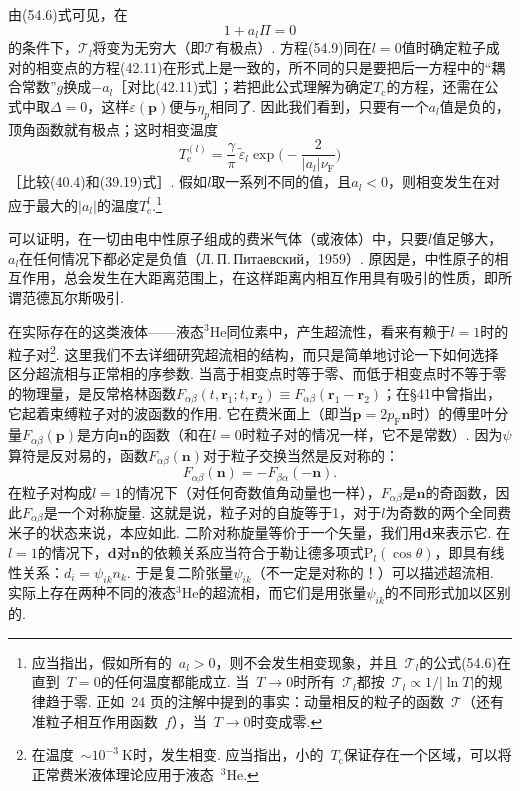 由(54.6)式可见，在
\begin{equation}
1+a_l\Pi=0
\end{equation}
的条件下，$\mathcal{T}_l$将变为无穷大（即$\mathcal{T}$有极点）. 方程(54.9)同在$l=0$值时确定粒子成对的相变点的方程(42.11)在形式上是一致的，所不同的只是要把后一方程中的“耦合常数”$g$换成$-a_l$［对比(42.11)式］；若把此公式理解为确定$T_{\mathrm{c}}$的方程，还需在公式中取$\Delta=0$，这样$\varepsilon(\bm{p})$便与$\eta_p$相同了. 因此我们看到，只要有一个$a_l$值是负的，顶角函数就有极点；这时相变温度
\begin{equation}
T_{\mathrm{c}}^{(l)}=\frac{\gamma}{\pi}\,\tilde{\varepsilon}_l
\exp\biggl(-\frac{2}{|a_l|\nu_{\mathrm{F}}}\biggr)
\end{equation}
［比较(40.4)和(39.19)式］. 假如$l$取一系列不同的值，且$a_l<0$，则相变发生在对应于最大的$|a_l|$的温度$T_{\mathrm{c}}^l$.\footnote{应当指出，假如所有的~$a_l>0$，则不会发生相变现象，并且~$\mathcal{T}_l$的公式(54.6)在直到~$T=0$的任何温度都能成立. 当~$T\to0$时所有~$\mathcal{T}_l$都按~$\mathcal{T}_l\propto1/|\ln T|$的规律趋于零. 正如~24 页的注解中提到的事实：动量相反的粒子的函数~$\mathcal{T}$（还有准粒子相互作用函数~$f$），当~$T\to0$时变成零.}

可以证明，在一切由电中性原子组成的费米气体（或液体）中，只要$l$值足够大，$a_l$在任何情况下都必定是负值（Л.\,П.\,Питаевский，1959）. 原因是，中性原子的相互作用，总会发生在大距离范围上，在这样距离内相互作用具有吸引的性质，即所谓范德瓦尔斯吸引.

在实际存在的这类液体——液态$^3\mathrm{He}$同位素中，产生超流性，看来有赖于$l=1$时的粒子对\footnote{在温度~$\sim10^{-3}\ \mathrm K$时，发生相变. 应当指出，小的~$T_{\mathrm c}$保证存在一个区域，可以将正常费米液体理论应用于液态~$^3$He.}. 这里我们不去详细研究超流相的结构，而只是简单地讨论一下如何选择区分超流相与正常相的序参数. 当高于相变点时等于零、而低于相变点时不等于零的物理量，是反常格林函数$F_{\alpha\beta}(t,\bm{r}_1;t,\bm{r}_2)\equiv F_{\alpha\beta}(\bm{r}_1-\bm{r}_2)$；在§41中曾指出，它起着束缚粒子对的波函数的作用. 它在费米面上（即当$\bm{p}=2p_{\mathrm{F}}\bm{n}$时）的傅里叶分量$F_{\alpha\beta}(\bm{p})$是方向$\bm{n}$的函数（和在$l=0$时粒子对的情况一样，它不是常数）. 因为$\psi$算符是反对易的，函数$F_{\alpha\beta}(\bm{n})$对于粒子交换当然是反对称的：
\begin{equation*}
F_{\alpha\beta}(\bm{n})=-F_{\beta\alpha}(-\bm{n}).
\end{equation*}
在粒子对构成$l=1$的情况下（对任何奇数值角动量也一样），$F_{\alpha\beta}$是$\bm{n}$的奇函数，因此$F_{\alpha\beta}$是一个对称旋量. 这就是说，粒子对的自旋等于1，对于$l$为奇数的两个全同费米子的状态来说，本应如此. 二阶对称旋量等价于一个矢量，我们用$\bm{d}$来表示它. 在$l=1$的情况下，$\bm{d}$对$\bm{n}$的依赖关系应当符合于勒让德多项式$\mathrm{P}_l(\cos\theta)$，即具有线性关系：$d_i=\psi_{ik}n_k$. 于是复二阶张量$\psi_{ik}$（不一定是对称的！）可以描述超流相. 实际上存在两种不同的液态$^3\mathrm{He}$的超流相，而它们是用张量$\psi_{ik}$的不同形式加以区别的.
